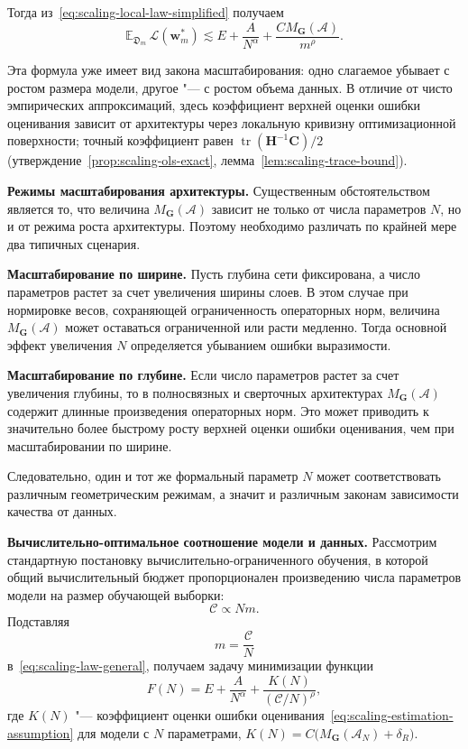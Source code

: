 Тогда из~\eqref{eq:scaling-local-law-simplified} получаем
\begin{equation}
    \label{eq:scaling-law-general}
    \mathbb E_{\mathfrak D_m}\,\mathcal L(\mathbf w_m^*)
    \lesssim
    E
    +
    \frac{A}{N^{\alpha}}
    +
    \frac{C M_{\mathbf G}(\mathcal A)}{m^{\rho}}.
\end{equation}

Эта формула уже имеет вид закона масштабирования: одно слагаемое убывает с ростом размера модели, другое "--- с ростом объема данных. В отличие от чисто эмпирических аппроксимаций, здесь коэффициент верхней оценки ошибки оценивания зависит от архитектуры через локальную кривизну оптимизационной поверхности; точный коэффициент равен $\operatorname{tr}(\mathbf H^{-1}\mathbf C)/2$ (утверждение~\ref{prop:scaling-ols-exact}, лемма~\ref{lem:scaling-trace-bound}).

\textbf{Режимы масштабирования архитектуры.} Существенным обстоятельством является то, что величина $M_{\mathbf G}(\mathcal A)$ зависит не только от числа параметров $N$, но и от режима роста архитектуры. Поэтому необходимо различать по крайней мере два типичных сценария.

\textbf{Масштабирование по ширине.}
Пусть глубина сети фиксирована, а число параметров растет за счет увеличения ширины слоев. В этом случае при нормировке весов, сохраняющей ограниченность операторных норм, величина $M_{\mathbf G}(\mathcal A)$ может оставаться ограниченной или расти медленно. Тогда основной эффект увеличения $N$ определяется убыванием ошибки выразимости.

\textbf{Масштабирование по глубине.}
Если число параметров растет за счет увеличения глубины, то в полносвязных и сверточных архитектурах $M_{\mathbf G}(\mathcal A)$ содержит длинные произведения операторных норм. Это может приводить к значительно более быстрому росту верхней оценки ошибки оценивания, чем при масштабировании по ширине.

Следовательно, один и тот же формальный параметр $N$ может соответствовать различным геометрическим режимам, а значит и различным законам зависимости качества от данных.

\textbf{Вычислительно-оптимальное соотношение модели и данных.} Рассмотрим стандартную постановку вычислительно-ограниченного обучения, в которой общий вычислительный бюджет пропорционален произведению числа параметров модели на размер обучающей выборки:
\begin{equation}
    \label{eq:scaling-compute}
    \mathcal C \propto N m.
\end{equation}
Подставляя
\begin{equation}
    m=\frac{\mathcal C}{N}
\end{equation}
в~\eqref{eq:scaling-law-general}, получаем задачу минимизации функции
\begin{equation}
    \label{eq:scaling-compute-target}
    F(N)
    =
    E
    +
    \frac{A}{N^{\alpha}}
    +
    \frac{K(N)}{(\mathcal C/N)^{\rho}},
\end{equation}
где $K(N)$ "--- коэффициент оценки ошибки оценивания~\eqref{eq:scaling-estimation-assumption} для модели с $N$ параметрами, $K(N) = C\big(M_{\mathbf G}(\mathcal A_N) + \delta_R\big)$.

